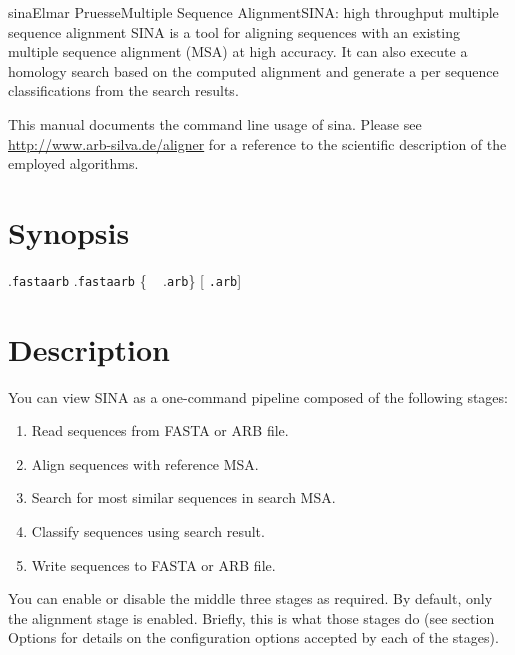 \documentclass[english,a4paper]{article}
\renewcommand{\URL}[1]{\url{#1}}
\begin{document}
\begin{Name}{1}{sina}{Elmar Pruesse}{Multiple Sequence Alignment}{SINA: high throughput multiple sequence alignment}
SINA is a tool for aligning sequences with an existing multiple sequence alignment (MSA) at high accuracy. It can also execute a homology search based
on the computed alignment and generate a per sequence classifications from the search results. 

This manual documents the command line usage of sina. Please see \URL{http://www.arb-silva.de/aligner} for a reference 
to the scientific description of the employed algorithms.

\end{Name}
\vfill
\tableofcontents
\vfill
\newpage


\section{Synopsis}
 .{\texttt{fasta}\Bar\texttt{arb}} .{\texttt{fasta}\Bar\texttt{arb}} 
\{ \Bar\  .\texttt{arb}\} [ \texttt{.arb}]  
\section{Description}

\noindent You can view SINA as a one-command pipeline composed of the following stages:

\begin{enumerate}
\item Read sequences from FASTA or ARB file.
\item Align sequences with reference MSA.
\item Search for most similar sequences in search MSA.
\item Classify sequences using search result.
\item Write sequences to FASTA or ARB file.
\end{enumerate}

You can enable or disable the middle three stages as required. By default, only the alignment stage is
enabled. Briefly, this is what those stages do (see section Options for details on the configuration
options accepted by each of the stages). 
\end{document}
